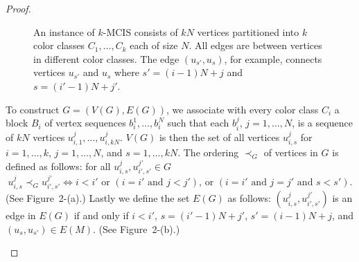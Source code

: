 \documentclass[11pt]{article}
\begin{document}
\begin{proof}
\begin{figure}
\begin{center}
\end{center}
\caption{An instance of \textsc{$k$-MCIS} consists of $kN$ vertices partitioned
into $k$ color classes $C_1, \dots, C_k$ each of size $N$. All edges are
between vertices in different color classes. The edge $(u_{s'}, u_s)$, for
example, connects vertices $u_{s'}$ and $u_s$ where $s' = (i-1)N+j$ and
$s=(i'-1)N+j'$.}
\end{figure}

To construct $G = (V(G),E(G))$, we associate with every color class $C_i$ a
block $B_i$ of vertex sequences $b_i^1,\dots,b_i^N$ such that each $b_i^j$, $j=1, \ldots, N$,
is a sequence of $kN$ vertices $u_{i,1}^j,\dots,u_{i,kN}^j$. $V(G)$ is then
the set of all vertices $u_{i,s}^j$ for $i = 1,\dots,k$, $j=1,\dots,N$, and
$s = 1,\dots,kN$. The ordering $\prec_G$ of vertices in $G$ is defined as
follows: for all $u_{i,s}^j, u_{i',s'}^{j'} \in G$
$$
u_{i,s}^j \prec_G u_{i',s'}^{j'} \iff
i < i' \mbox{ or } (i = i' \mbox{ and } j < j') \mbox{, or }
(i=i' \mbox{ and } j=j' \mbox{ and } s < s').
$$
(See Figure~2-(a).) Lastly we define the set $E(G)$ as follows: $(u_{i,s}^j, u_{i',s'}^{j'})$
is an edge in $E(G)$ if and only if $i < i'$, $s = (i'-1)N+j'$, $s'=(i-1)N+j$,
and $(u_s, u_{s'}) \in E(M)$. (See Figure~2-(b).)

\begin{figure}
\label{fig100}
\end{figure}
\end{proof}
\end{document}

